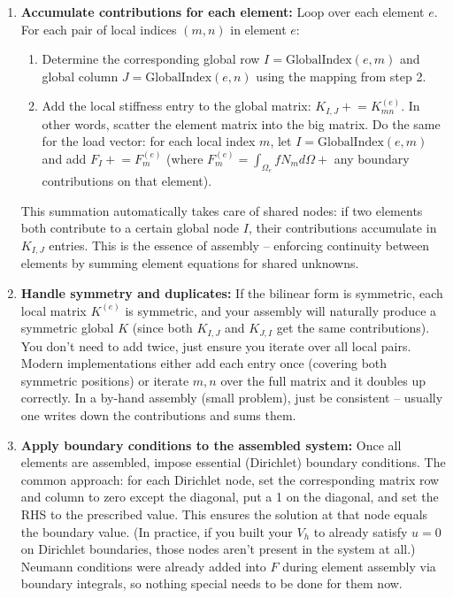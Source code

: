 \documentclass[a4paper,11pt]{report}
\begin{document}
\begin{enumerate}
    \item \textbf{Accumulate contributions for each element:} Loop over each element $e$. For each pair of local indices $(m,n)$ in element $e$:
          \begin{enumerate}
              \item Determine the corresponding global row $I = \text{GlobalIndex}(e, m)$ and global column $J = \text{GlobalIndex}(e, n)$ using the mapping from step 2.
              \item Add the local stiffness entry to the global matrix: $K_{I,J} \mathrel{+}= K^{(e)}_{mn}$. In other words, scatter the element matrix into the big matrix. Do the same for the load vector: for each local index $m$, let $I=\text{GlobalIndex}(e,m)$ and add $F_I \mathrel{+}= F^{(e)}_m$ (where $F^{(e)}_m = \int_{\Omega_e} f N_m d\Omega +$ any boundary contributions on that element).
          \end{enumerate}
          This summation automatically takes care of shared nodes: if two elements both contribute to a certain global node $I$, their contributions accumulate in $K_{I,J}$ entries. This is the essence of assembly -- enforcing continuity between elements by summing element equations for shared unknowns.

    \item \textbf{Handle symmetry and duplicates:} If the bilinear form is symmetric, each local matrix $K^{(e)}$ is symmetric, and your assembly will naturally produce a symmetric global $K$ (since both $K_{I,J}$ and $K_{J,I}$ get the same contributions). You don't need to add twice, just ensure you iterate over all local pairs. Modern implementations either add each entry once (covering both symmetric positions) or iterate $m,n$ over the full matrix and it doubles up correctly. In a by-hand assembly (small problem), just be consistent -- usually one writes down the contributions and sums them.

    \item \textbf{Apply boundary conditions to the assembled system:} Once all elements are assembled, impose essential (Dirichlet) boundary conditions. The common approach: for each Dirichlet node, set the corresponding matrix row and column to zero except the diagonal, put a 1 on the diagonal, and set the RHS to the prescribed value. This ensures the solution at that node equals the boundary value. (In practice, if you built your $V_h$ to already satisfy $u=0$ on Dirichlet boundaries, those nodes aren't present in the system at all.) Neumann conditions were already added into $F$ during element assembly via boundary integrals, so nothing special needs to be done for them now.


\end{enumerate}
\end{document}
